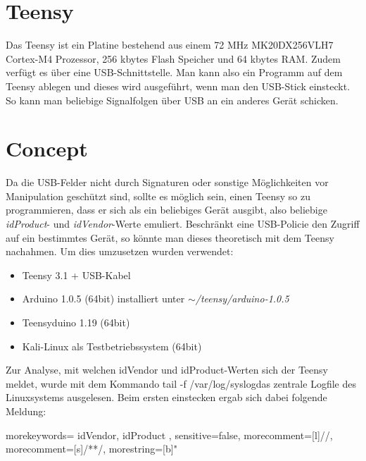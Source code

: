 \section{Teensy}
Das Teensy ist ein Platine bestehend aus einem 72 MHz MK20DX256VLH7 Cortex-M4 Prozessor, 256 kbytes Flash Speicher und 64 kbytes RAM. Zudem verfügt es über eine USB-Schnittstelle. Man kann also ein Programm auf dem Teensy ablegen und dieses wird ausgeführt, wenn man den USB-Stick einsteckt. So kann man beliebige Signalfolgen über USB an ein anderes Gerät schicken.
			
\section{Concept}
Da die USB-Felder nicht durch Signaturen oder sonstige Möglichkeiten vor Manipulation geschützt sind, sollte es möglich sein, einen Teensy so zu programmieren, dass er sich als ein beliebiges Gerät ausgibt, also beliebige \textit{idProduct}- und \textit{idVendor}-Werte emuliert. Beschränkt eine USB-Policie den Zugriff auf ein bestimmtes Gerät, so könnte man dieses theoretisch mit dem Teensy nachahmen.
Um dies umzusetzen wurden verwendet:

\begin{itemize}
	\item Teensy 3.1 + USB-Kabel
	\item Arduino 1.0.5 (64bit) installiert unter \textit{$\sim$/teensy/arduino-1.0.5}
	\item Teensyduino 1.19 (64bit)
	\item Kali-Linux als Testbetriebssystem (64bit)
\end{itemize}

Zur Analyse, mit welchen idVendor und idProduct-Werten sich der Teensy meldet, wurde mit dem Kommando \glqq tail -f /var/log/syslog\grqq das zentrale Logfile des Linuxsystems ausgelesen. Beim ersten einstecken ergab sich dabei folgende Meldung:
	
{
  morekeywords={
    idVendor,
    idProduct
  },
  sensitive=false, %
  morecomment=[l]{//}, %
  morecomment=[s]{/*}{*/}, %
  morestring=[b]" %
}

